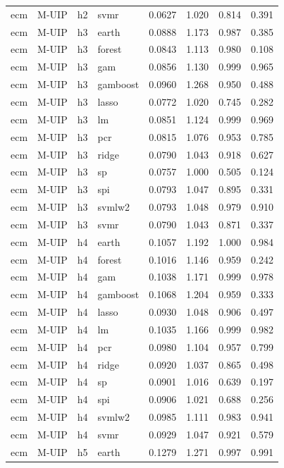 \begin{ThreePartTable}
\begin{longtable}[t]{llclcccc}
ecm & M-UIP & h2 & svmr & 0.0627 & 1.020 & 0.814 & 0.391\\
\addlinespace
ecm & M-UIP & h3 & earth & 0.0888 & 1.173 & 0.987 & 0.385\\
ecm & M-UIP & h3 & forest & 0.0843 & 1.113 & 0.980 & 0.108\\
ecm & M-UIP & h3 & gam & 0.0856 & 1.130 & 0.999 & 0.965\\
ecm & M-UIP & h3 & gamboost & 0.0960 & 1.268 & 0.950 & 0.488\\
ecm & M-UIP & h3 & lasso & 0.0772 & 1.020 & 0.745 & 0.282\\
ecm & M-UIP & h3 & lm & 0.0851 & 1.124 & 0.999 & 0.969\\
ecm & M-UIP & h3 & pcr & 0.0815 & 1.076 & 0.953 & 0.785\\
ecm & M-UIP & h3 & ridge & 0.0790 & 1.043 & 0.918 & 0.627\\
ecm & M-UIP & h3 & sp & 0.0757 & 1.000 & 0.505 & 0.124\\
ecm & M-UIP & h3 & spi & 0.0793 & 1.047 & 0.895 & 0.331\\
ecm & M-UIP & h3 & svmlw2 & 0.0793 & 1.048 & 0.979 & 0.910\\
ecm & M-UIP & h3 & svmr & 0.0790 & 1.043 & 0.871 & 0.337\\
\addlinespace
ecm & M-UIP & h4 & earth & 0.1057 & 1.192 & 1.000 & 0.984\\
ecm & M-UIP & h4 & forest & 0.1016 & 1.146 & 0.959 & 0.242\\
ecm & M-UIP & h4 & gam & 0.1038 & 1.171 & 0.999 & 0.978\\
ecm & M-UIP & h4 & gamboost & 0.1068 & 1.204 & 0.959 & 0.333\\
ecm & M-UIP & h4 & lasso & 0.0930 & 1.048 & 0.906 & 0.497\\
ecm & M-UIP & h4 & lm & 0.1035 & 1.166 & 0.999 & 0.982\\
ecm & M-UIP & h4 & pcr & 0.0980 & 1.104 & 0.957 & 0.799\\
ecm & M-UIP & h4 & ridge & 0.0920 & 1.037 & 0.865 & 0.498\\
ecm & M-UIP & h4 & sp & 0.0901 & 1.016 & 0.639 & 0.197\\
ecm & M-UIP & h4 & spi & 0.0906 & 1.021 & 0.688 & 0.256\\
ecm & M-UIP & h4 & svmlw2 & 0.0985 & 1.111 & 0.983 & 0.941\\
ecm & M-UIP & h4 & svmr & 0.0929 & 1.047 & 0.921 & 0.579\\
\addlinespace
ecm & M-UIP & h5 & earth & 0.1279 & 1.271 & 0.997 & 0.991\\

\end{longtable}
\end{ThreePartTable}
